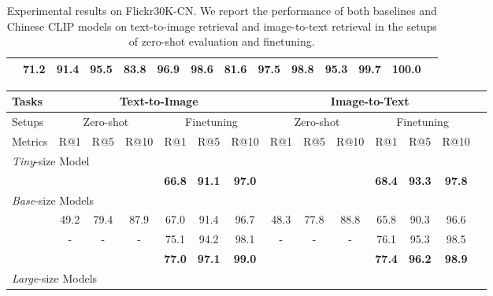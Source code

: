 \documentclass[11pt]{article}
\begin{document}
\begin{table*}[t]
\begin{adjustbox}{max width=1.\textwidth}
\begin{tabular}{@{\extracolsep{\fill}}lccccccccccccc}
    & \textbf{71.2}	& \textbf{91.4}	& \textbf{95.5}	& \textbf{83.8}	& \textbf{96.9}	& \textbf{98.6}	& \textbf{81.6}	& \textbf{97.5}	& \textbf{98.8}	& \textbf{95.3}	& \textbf{99.7}	& \textbf{100.0}
    \\
\bottomrule
\end{tabular}
\end{adjustbox}
\caption{Experimental results on Flickr30K-CN. We report the performance of both baselines and Chinese CLIP models on text-to-image retrieval and image-to-text retrieval in the setups of zero-shot evaluation and finetuning. }
\label{tb:flickr}
\end{table*}


\begin{table*}[t]
\center
\small
\vskip 0.15in
\begin{adjustbox}{max width=1.\textwidth}
\begin{tabular}{@{\extracolsep{\fill}}lccccccccccccc}
\toprule
  Tasks
  &\multicolumn{6}{c}{Text-to-Image}
  &\multicolumn{6}{c}{Image-to-Text}
  \\
\midrule
  Setups
  &\multicolumn{3}{c}{Zero-shot}
  &\multicolumn{3}{c}{Finetuning}
  &\multicolumn{3}{c}{Zero-shot}
  &\multicolumn{3}{c}{Finetuning}
  \\
\midrule
  Metrics & R@1 & R@5 & R@10 & R@1 & R@5 & R@10 & R@1 & R@5 & R@10 & R@1 & R@5 & R@10 
  \\
\midrule
    \multicolumn{13}{l}{\textit{Tiny}-size Model} \\
    
    & \color{gray}{48.1}	& \color{gray}{81.3}	& \color{gray}{90.5}	& \textbf{66.8}	& \textbf{91.1}	& \textbf{97.0}	& \color{gray}{51.6}	& \color{gray}{81.2}	& \color{gray}{90.5}	& \textbf{68.4}	& \textbf{93.3}	& \textbf{97.8}
    \\
\midrule
    \multicolumn{13}{l}{\textit{Base}-size Models} \\
    
    & 49.2	& 79.4	& 87.9	& 67.0	& 91.4	& 96.7	& 48.3	& 77.8	& 88.8	& 65.8	& 90.3	& 96.6
    \\
    
    & -	& -	& -	& 75.1	& 94.2	& 98.1	& -	& -	& -	& 76.1	& 95.3	& 98.5
    \\
    
    & \color{gray}{62.2}	& \color{gray}{86.6}	& \color{gray}{94.9}	& \textbf{77.0}	& \textbf{97.1}	& \textbf{99.0}	& \color{gray}{57.0}	& \color{gray}{84.1}	& \color{gray}{93.6}	& \textbf{77.4}	& \textbf{96.2}	& \textbf{98.9}
    \\
\midrule
    \multicolumn{9}{l}{\textit{Large}-size Models} \\
    

\end{tabular}
\end{adjustbox}
\end{table*}
\end{document}
